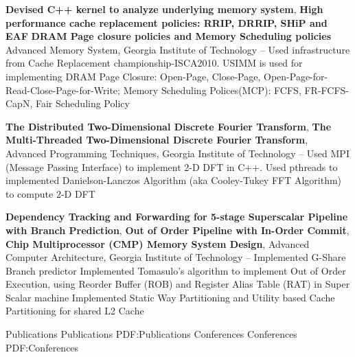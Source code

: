 \documentclass[letterpaper,MMMyyyy,nonstopmode]{simpleresumecv}
\begin{document}
\begin{Body}
\BigGap
\Entry
{\textbf{Devised C++ kernel to analyze underlying memory system}},
\newline
{\textbf{High performance cache replacement policies: RRIP, DRRIP, SHiP and EAF}}
\newline
{\textbf{DRAM Page closure policies and Memory Scheduling policies}}
\newline
Advanced Memory System, Georgia Institute of Technology
\hfill
{} --
\BulletItem
Used infrastructure from Cache Replacement championship-ISCA2010.
\BulletItem
USIMM is used for implementing DRAM Page Closure: Open-Page, Close-Page, Open-Page-for-Read-Close-Page-for-Write; Memory Scheduling Polices(MCP): FCFS, FR-FCFS-CapN, Fair Scheduling Policy

\BigGap
\Entry
{\textbf{The Distributed Two-Dimensional Discrete Fourier Transform}},
\newline
{\textbf{The Multi-Threaded Two-Dimensional Discrete Fourier Transform}},
\newline
Advanced Programming Techniques, Georgia Institute of Technology
\hfill
{} --
\BulletItem
Used MPI (Message Passing Interface) to implement 2-D DFT in C++.
\BulletItem
Used pthreads to implemented Danielson-Lanczos Algorithm (aka Cooley-Tukey FFT Algorithm) to
compute 2-D DFT

\BigGap
\Entry
{\textbf{Dependency Tracking and Forwarding for 5-stage Superscalar Pipeline with Branch Prediction}},
\newline
{\textbf{Out of Order Pipeline with In-Order Commit}},
\newline
{\textbf{Chip Multiprocessor (CMP) Memory System Design}},
\newline
Advanced Computer Architecture, Georgia Institute of Technology
\hfill
{} --
\BulletItem
Implemented G-Share Branch predictor
\BulletItem
Implemented Tomasulo's algorithm to implement Out of Order Execution, using Reorder Buffer (ROB) and Register Alias Table (RAT) in Super Scalar machine
\BulletItem
Implemented Static Way Partitioning and Utility based Cache Partitioning for shared L2 Cache



\Section
{Publications}
{Publications}
{PDF:Publications}
\BigGap
\SubSection
{Conferences}
{Conferences}
{PDF:Conferences}


\end{Body}
\end{document}
